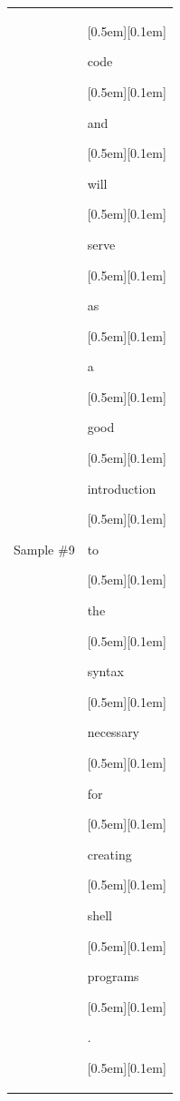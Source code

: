 \begin{table}[ht]
\begin{tabular}{@{}l p{13cm}@{}}
\vspace{10pt}
Sample \#9 &
{\setlength{\fboxsep}{1pt}\raisebox{0pt}[0.5em][0.1em]{\colorbox{Salmon!60}{\strut{ code}}}}{\setlength{\fboxsep}{1pt}\raisebox{0pt}[0.5em][0.1em]{\colorbox{DarkOrchid!25}{\strut{ and}}}}{\setlength{\fboxsep}{1pt}\raisebox{0pt}[0.5em][0.1em]{\colorbox{DarkOrchid!25}{\strut{ will}}}}{\setlength{\fboxsep}{1pt}\raisebox{0pt}[0.5em][0.1em]{\colorbox{DarkOrchid!25}{\strut{ serve}}}}{\setlength{\fboxsep}{1pt}\raisebox{0pt}[0.5em][0.1em]{\colorbox{DarkOrchid!25}{\strut{ as}}}}{\setlength{\fboxsep}{1pt}\raisebox{0pt}[0.5em][0.1em]{\colorbox{DarkOrchid!25}{\strut{ a}}}}{\setlength{\fboxsep}{1pt}\raisebox{0pt}[0.5em][0.1em]{\colorbox{DarkOrchid!25}{\strut{ good}}}}{\setlength{\fboxsep}{1pt}\raisebox{0pt}[0.5em][0.1em]{\colorbox{DarkOrchid!25}{\strut{ introduction}}}}{\setlength{\fboxsep}{1pt}\raisebox{0pt}[0.5em][0.1em]{\colorbox{DarkOrchid!25}{\strut{ to}}}}{\setlength{\fboxsep}{1pt}\raisebox{0pt}[0.5em][0.1em]{\colorbox{DarkOrchid!25}{\strut{ the}}}}{\setlength{\fboxsep}{1pt}\raisebox{0pt}[0.5em][0.1em]{\colorbox{DarkOrchid!25}{\strut{ syntax}}}}{\setlength{\fboxsep}{1pt}\raisebox{0pt}[0.5em][0.1em]{\colorbox{DarkOrchid!25}{\strut{ necessary}}}}{\setlength{\fboxsep}{1pt}\raisebox{0pt}[0.5em][0.1em]{\colorbox{Salmon!60}{\strut{ for}}}}{\setlength{\fboxsep}{1pt}\raisebox{0pt}[0.5em][0.1em]{\colorbox{SkyBlue!55}{\strut{ creating}}}}{\setlength{\fboxsep}{1pt}\raisebox{0pt}[0.5em][0.1em]{\colorbox{Salmon!60}{\strut{ shell}}}}{\setlength{\fboxsep}{1pt}\raisebox{0pt}[0.5em][0.1em]{\colorbox{DarkOrchid!25}{\strut{ programs}}}}{\setlength{\fboxsep}{1pt}\raisebox{0pt}[0.5em][0.1em]{\colorbox{DarkOrchid!25}{\strut{.}}}}{\setlength{\fboxsep}{1pt}\raisebox{0pt}[0.5em][0.1em]{\colorbox{DarkOrchid!25}{\strut{ }}}}


\end{tabular}
\end{table}
